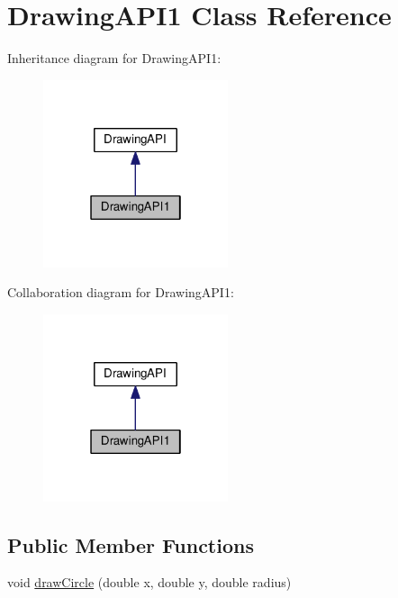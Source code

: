 \hypertarget{classDrawingAPI1}{}\section{Drawing\+A\+P\+I1 Class Reference}
\label{classDrawingAPI1}


Inheritance diagram for Drawing\+A\+P\+I1\+:
\nopagebreak
\begin{figure}[H]
\begin{center}
\leavevmode
\includegraphics[width=154pt]{classDrawingAPI1__inherit__graph}
\end{center}
\end{figure}


Collaboration diagram for Drawing\+A\+P\+I1\+:
\nopagebreak
\begin{figure}[H]
\begin{center}
\leavevmode
\includegraphics[width=154pt]{classDrawingAPI1__coll__graph}
\end{center}
\end{figure}
\subsection*{Public Member Functions}
\begin{DoxyCompactItemize}
\item 
void \hyperlink{classDrawingAPI1_a53f3e670724c097445f342824ddf434e}{draw\+Circle} (double x, double y, double radius)
\end{DoxyCompactItemize}


